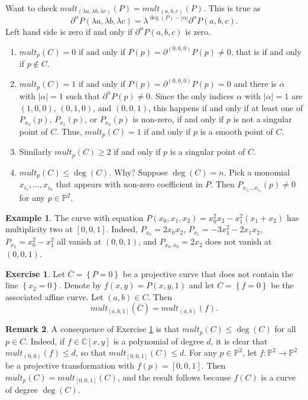 \documentclass{article}
\newcommand{\C}{\mathbb{C}}
\renewcommand{\P}{\mathbb{P}}
\newcommand{\rb}[1]{\left( #1 \right)}
\renewcommand{\sb}[1]{\left[ #1 \right]}
\newcommand{\cb}[1]{\left\{ #1 \right\}}
\newcommand{\abs}[1]{\left\lvert #1 \right\rvert}
\theoremstyle{definition}\newtheorem{definition}{Definition}[section]
\theoremstyle{definition}\newtheorem{notation}[definition]{Notation}
\theoremstyle{definition}\newtheorem{remark}[definition]{Remark}
\theoremstyle{definition}\newtheorem{example}[definition]{Example}
\theoremstyle{definition}\newtheorem{fact}{Fact}
\theoremstyle{definition}\newtheorem{exercise}{Exercise}
\begin{document}
Want to check $ mult_{\rb{\lambda a, \lambda b, \lambda c}}\rb{P} = mult_{\rb{a, b, c}}\rb{P} $. This is true as
$$ \partial^\alpha P\rb{\lambda a, \lambda b, \lambda c} = \lambda^{\deg\rb{P} - \abs{\alpha}}\partial^\alpha P\rb{a, b, c}. $$
Left hand side is zero if and only if $ \partial^\alpha P\rb{a, b, c} $ is zero.
\begin{enumerate}
\item $ mult_p\rb{C} = 0 $ if and only if $ P\rb{p} = \partial^{\rb{0, 0, 0}} P\rb{p} \ne 0 $, that is if and only if $ p \notin C $.
\item $ mult_p\rb{C} = 1 $ if and only if $ P\rb{p} = \partial^{\rb{0, 0, 0}} P\rb{p} = 0 $ and there is $ \alpha $ with $ \abs{\alpha} = 1 $ such that $ \partial^{\alpha} P\rb{p} \ne 0 $. Since the only indices $ \alpha $ with $ \abs{\alpha} = 1 $ are $ \rb{1, 0, 0} $, $ \rb{0, 1, 0} $, and $ \rb{0, 0, 1} $, this happens if and only if at least one of $ P_{x_0}\rb{p} $, $ P_{x_1}\rb{p} $, or $ P_{x_2}\rb{p} $ is non-zero, if and only if $ p $ is not a singular point of $ C $. Thus, $ mult_p\rb{C} = 1 $ if and only if $ p $ is a smooth point of $ C $.
\item Similarly $ mult_p\rb{C} \ge 2 $ if and only if $ p $ is a singular point of $ C $.
\item $ mult_p\rb{C} \le \deg\rb{C} $. Why? Suppose $ \deg\rb{C} = n $. Pick a monomial $ x_{i_1}, \dots, x_{i_n} $ that appears with non-zero coefficient in $ P $. Then $ P_{x_{i_1} \dots x_{i_n}}\rb{p} \ne 0 $ for any $ p \in \P^2 $.
\end{enumerate}

\begin{example}
The curve with equation $ P\rb{x_0, x_1, x_2} = x_0^2x_2 - x_1^2\rb{x_1 + x_2} $ has multiplicity two at $ \sb{0, 0, 1} $. Indeed, $ P_{x_0} = 2x_0x_2 $, $ P_{x_1} = -3x_1^2 - 2x_1x_2 $, $ P_{x_2} = x_0^2 - x_1^2 $ all vanish at $ \rb{0, 0, 1} $, and $ P_{x_0, x_0} = 2x_2 $ does not vanish at $ \rb{0, 0, 1} $.
\end{example}

\begin{exercise}
\label{ex:31}
Let $ \overline{C} = \cb{P = 0} $ be a projective curve that does not contain the line $ \cb{x_2 = 0} $. Denote by $ f\rb{x, y} = P\rb{x, y, 1} $ and let $ C = \cb{f = 0} $ be the associated affine curve. Let $ \rb{a, b} \in C $. Then
$$ mult_{\sb{a, b, 1}}\rb{\overline{C}} = mult_{\rb{a, b}}\rb{f}. $$
\end{exercise}

\begin{remark}
\label{rem:11.4}
A consequence of Exercise \ref{ex:31} is that $ mult_p\rb{C} \le \deg\rb{C} $ for all $ p \in C $. Indeed, if $ f \in \C\sb{x, y} $ is a polynomial of degree $ d $, it is clear that $ mult_{\rb{0, 0}}\rb{f} \le d $, so that $ mult_{\sb{0, 0, 1}}\rb{C} \le d $. For any $ p \in \P^2 $, let $ f : \P^2 \to \P^2 $ be a projective transformation with $ f\rb{p} = \sb{0, 0, 1} $. Then $ mult_p\rb{C} = mult_{\sb{0, 0, 1}}\rb{C} $, and the result follows because $ f\rb{C} $ is a curve of degree $ \deg\rb{C} $.
\end{remark}
\end{document}
